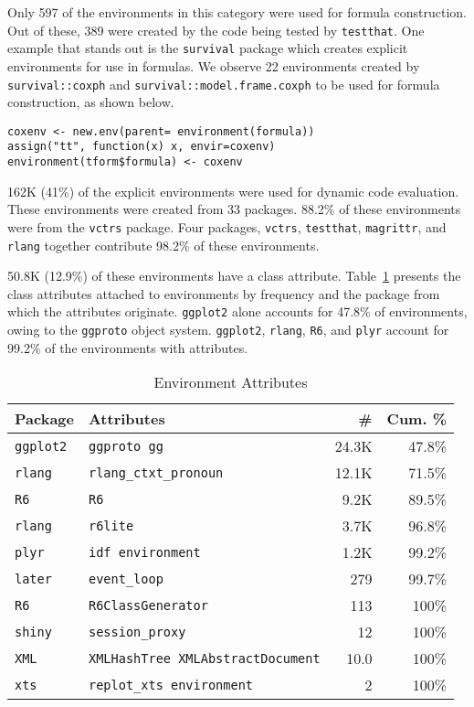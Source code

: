 \documentclass[10pt,review,sigplan,authorversion=true]{acmart}
\newcommand{\code}[1]{\lstinline |#1|\xspace}
\begin{document}
Only 597 of the environments in this category were used for formula
construction. Out of these, 389 were created by the code being tested by
\code{testthat}. One example that stands out is the \code{survival} package
which creates explicit environments for use in formulas. We observe 22
environments created by \code{survival::coxph} and
\code{survival::model.frame.coxph} to be used for formula construction, as shown
below.

\begin{lstlisting}
coxenv <- new.env(parent= environment(formula))
assign("tt", function(x) x, envir=coxenv)
environment(tform$formula) <- coxenv
\end{lstlisting}

162K (41\%) of the explicit environments were used for dynamic code evaluation.
These environments were created from 33 packages. 88.2\% of these environments
were from the \code{vctrs} package. Four packages, \code{vctrs},
\code{testthat}, \code{magrittr}, and \code{rlang} together contribute 98.2\% of
these environments.

50.8K (12.9\%) of these environments have a class attribute.
Table~\ref{table:explicit_env_attr} presents the class attributes attached to
environments by frequency and the package from which the attributes originate.
\code{ggplot2} alone accounts for 47.8\% of environments, owing to the
\code{ggproto} object system. \code{ggplot2}, \code{rlang}, \code{R6}, and
\code{plyr} account for 99.2\% of the environments with attributes.
\begin{table}[!h]
  \small
  \caption{Environment Attributes} \label{table:explicit_env_attr}
  \centering
  \begin{tabular}{@{}ll@{}rr@{}}
    \toprule
    \textbf{Package}&\textbf{Attributes}&\textbf{\#}&\textbf{Cum. \%}\\
    \midrule
    \texttt{ggplot2}&\texttt{ggproto gg}&24.3K&47.8\%\\
    \texttt{rlang}&\texttt{rlang\_ctxt\_pronoun}&12.1K&71.5\%\\
    \texttt{R6}&\texttt{R6}&9.2K&89.5\%\\
    \texttt{rlang}&\texttt{r6lite}&3.7K&96.8\%\\
    \texttt{plyr}&\texttt{idf environment}&1.2K&99.2\%\\
    \texttt{later}&\texttt{event\_loop}&279&99.7\%\\
    \texttt{R6}&\texttt{R6ClassGenerator}&113&100\%\\
    \texttt{shiny}&\texttt{session\_proxy}&12&100\%\\
    \texttt{XML}&\texttt{XMLHashTree XMLAbstractDocument}&10.0&100\%\\
    \texttt{xts}&\texttt{replot\_xts environment}&2&100\%\\
    \bottomrule
  \end{tabular}
\end{table}
\end{document}
